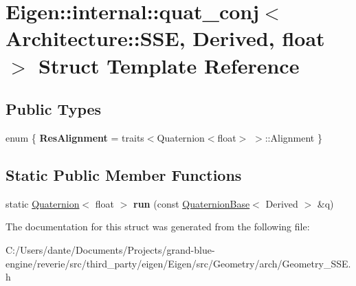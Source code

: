 \hypertarget{struct_eigen_1_1internal_1_1quat__conj_3_01_architecture_1_1_s_s_e_00_01_derived_00_01float_01_4}{}\section{Eigen\+::internal\+::quat\+\_\+conj$<$ Architecture\+::S\+SE, Derived, float $>$ Struct Template Reference}
\label{struct_eigen_1_1internal_1_1quat__conj_3_01_architecture_1_1_s_s_e_00_01_derived_00_01float_01_4}
\subsection*{Public Types}
\begin{DoxyCompactItemize}
\item 
\mbox{\label{struct_eigen_1_1internal_1_1quat__conj_3_01_architecture_1_1_s_s_e_00_01_derived_00_01float_01_4_a802c38e37ac23bfa976066471dbcd479}} 
enum \{ {\bfseries Res\+Alignment} = traits$<$Quaternion$<$float$>$ $>$\+::Alignment
 \}
\end{DoxyCompactItemize}
\subsection*{Static Public Member Functions}
\begin{DoxyCompactItemize}
\item 
\mbox{\label{struct_eigen_1_1internal_1_1quat__conj_3_01_architecture_1_1_s_s_e_00_01_derived_00_01float_01_4_a34a5a10a0fc175f12721c10c2c0b8ec3}} 
static \mbox{\hyperlink{class_eigen_1_1_quaternion}{Quaternion}}$<$ float $>$ {\bfseries run} (const \mbox{\hyperlink{class_eigen_1_1_quaternion_base}{Quaternion\+Base}}$<$ Derived $>$ \&q)
\end{DoxyCompactItemize}


The documentation for this struct was generated from the following file\+:\begin{DoxyCompactItemize}
\item 
C\+:/\+Users/dante/\+Documents/\+Projects/grand-\/blue-\/engine/reverie/src/third\+\_\+party/eigen/\+Eigen/src/\+Geometry/arch/Geometry\+\_\+\+S\+S\+E.\+h\end{DoxyCompactItemize}
